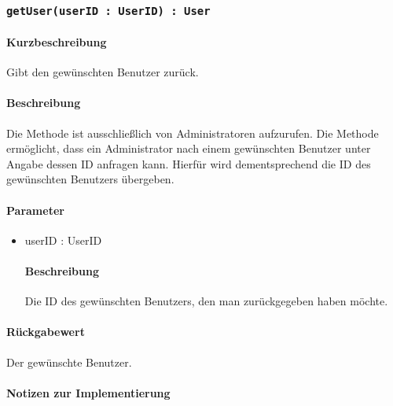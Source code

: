 \subsubsection{\texttt{getUser(userID : UserID) : User}}%
\paragraph*{Kurzbeschreibung}
Gibt den gewünschten Benutzer zurück.
\paragraph*{Beschreibung}
Die Methode ist ausschließlich von Administratoren aufzurufen.
Die Methode ermöglicht, dass ein Administrator nach einem gewünschten Benutzer unter Angabe dessen ID anfragen kann.
Hierfür wird dementsprechend die ID des gewünschten Benutzers übergeben.
\paragraph*{Parameter}
\begin{itemize}
    \item userID : UserID
    		\paragraph*{Beschreibung}
    		Die ID des gewünschten Benutzers, den man zurückgegeben haben möchte.
\end{itemize}
\paragraph*{Rückgabewert}
Der gewünschte Benutzer.

\paragraph*{Notizen zur Implementierung}%
